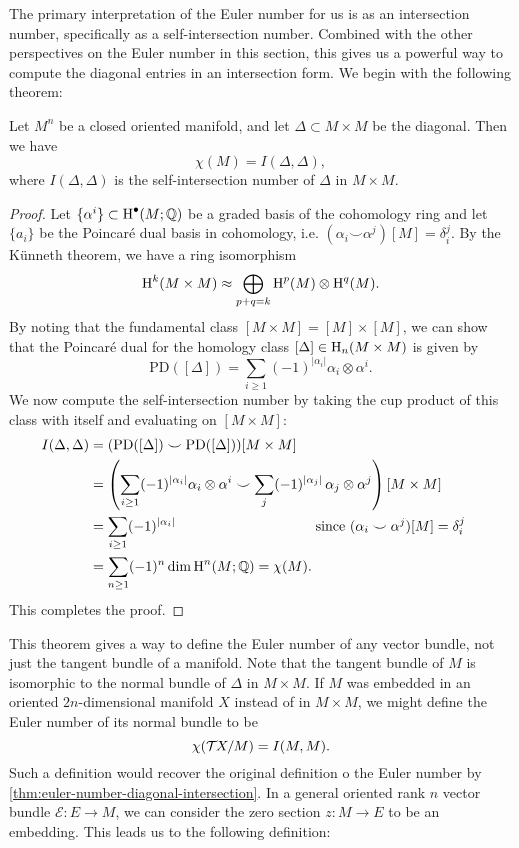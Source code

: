 The primary interpretation of the Euler number for us is as an intersection number, specifically as a self-intersection number. Combined with the other perspectives on the Euler number in this section, this gives us a powerful way to compute the diagonal entries in an intersection form. We begin with the following theorem: 
\begin{theorem}\label{thm:euler-number-diagonal-intersection}
  Let $M^n$ be a closed oriented manifold, and let $\Delta\subset M\times M$ be the diagonal. 
  Then we have
  \[
    \chi(M) = I(\Delta, \Delta),
  \]
  where $I(\Delta,\Delta)$ is the self-intersection number of $\Delta$ in $M\times M$.
\end{theorem}
\begin{proof}
  Let $\{\alpha^i\}\subset \operatorname{H}^\bullet(M; \mathbb{Q})$ be a graded basis of the cohomology ring and let $\{a_i\}$ be the Poincar\'e dual basis in cohomology, i.e. $(\alpha_i\smile \alpha^j)[M]=\delta^j_i$. By the K\"unneth theorem, we have a ring isomorphism
  \[
    \operatorname{H}^{k}(M\times M) \approx \bigoplus_{p+q=k} \operatorname{H}^p(M)\otimes \operatorname{H}^q(M).
  \]
  By noting that the fundamental class $[M\times M]=[M]\times [M]$, we can show that the Poincar\'e dual for the homology class $[\Delta]\in \operatorname{H}_{n}(M\times M)$ is given by
  \[
      \mathrm{PD}([\Delta]) = \sum_{i\geq 1}(-1)^{|\alpha_i|}\alpha_i\otimes \alpha^i.
  \]
We now compute the self-intersection number by taking the cup product of 
  this class with itself and evaluating on \([M \times M]\):
  \[
  \begin{aligned}
    I(\Delta, \Delta) &=
    (\mathrm{PD}([\Delta]) \smile \mathrm{PD}([\Delta]))
    [M \times M]\\
    &= \left(\sum_{i\geq 1} (-1)^{|\alpha_i|}\alpha_i \otimes \alpha^i
           \smile
           \sum_j (-1)^{|\alpha_j|}\,\alpha_j \otimes \alpha^j\right)
    [M \times M]&\\
                &= \sum_{i\geq 1}(-1)^{|\alpha_i|}\hspace{10em}\textrm{since $(\alpha_i\smile \alpha^j)[M]=\delta^j_i$}&\\
    &= \sum_{n\geq 1} (-1)^n\dim \H^n(M;\Q) = \chi(M).
  \end{aligned}
  \]
  This completes the proof.
\end{proof}

This theorem gives a way to define the Euler number of any vector bundle, not just the tangent bundle of a manifold. Note that the tangent bundle of $M$ is isomorphic to the normal bundle of $\Delta$ in $M\times M$. If $M$ was embedded in an oriented $2n$-dimensional manifold $X$ instead of in $M\times M$, we might define the Euler number of its normal bundle to be
\[
    \chi({\mathcal{T}\hspace{-0.1em}} X/M) = I(M,M).
\]
Such a definition would recover the original definition o the Euler number by \cref{thm:euler-number-diagonal-intersection}. In a general oriented rank $n$ vector bundle $\mathcal{E} : E \to M$, we can consider the zero section $z : M \to E$ to be an embedding. This leads us to the following definition:

